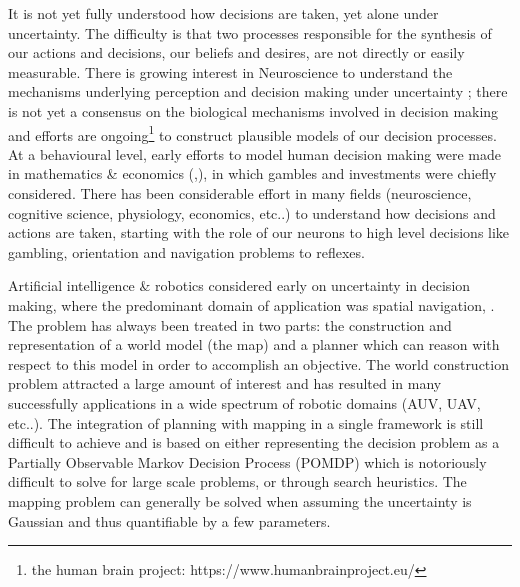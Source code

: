 
%


It is not yet fully understood how decisions are taken, yet alone under uncertainty. The difficulty is that two processes responsible 
for the synthesis of our actions and decisions, our beliefs and desires, are not directly or easily measurable. There is growing interest in 
Neuroscience to understand the mechanisms underlying perception and decision making under uncertainty \cite{decision_un_2013}; there is not 
yet a consensus on the biological mechanisms involved in decision making and efforts are 
ongoing\footnote{the human brain project: https://www.humanbrainproject.eu/} to construct plausible models of our decision processes. 
At a behavioural level, early efforts to model human decision making were made in mathematics \& economics 
(\cite{Bernoulli1954},\cite{VonNeumann1944}), in which gambles and investments were chiefly considered. There has been 
considerable effort in many fields (neuroscience, cognitive science, physiology, economics, etc..) to understand how decisions and actions 
are taken, starting with the role of our neurons to high level decisions like gambling, orientation and navigation problems to reflexes. 

Artificial intelligence \& robotics considered early on uncertainty in decision making, 
where the predominant domain of application was spatial navigation, \cite{ActingUncertainty_1996}. The problem has 
always been treated in two parts: the construction and representation of a world model (the map) and a planner which can reason with 
respect to this model in order to accomplish an objective. The world construction problem attracted a large amount of 
interest and has resulted in many successfully applications in a wide spectrum of robotic domains (AUV, UAV, etc..). The integration of planning 
with mapping in a single framework is still difficult to achieve and is based on either representing the decision problem as a 
Partially Observable Markov Decision Process (POMDP) which is notoriously difficult to solve for large scale problems, or through search heuristics.  
The mapping problem can generally be solved when assuming the uncertainty is Gaussian and thus quantifiable 
by a few parameters.%


